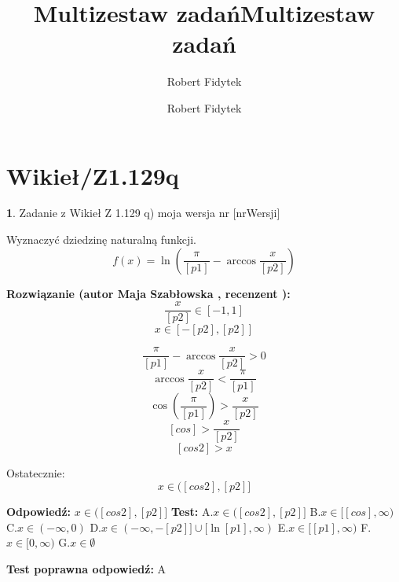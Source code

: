 \documentclass[12pt, a4paper]{article}
\title{Multizestaw zadań}
\author{Robert Fidytek}
\date{}\documentclass[12pt, a4paper]{article}
\title{Multizestaw zadań}
\author{Robert Fidytek}
\date{}
\theoremstyle{definition} %
\newtheorem{zad}{}
\theoremstyle{definition} %
\newtheorem{zad}{}
\newcommand{\kategoria}[1]{\section{#1}} %
\newcommand{\zadStart}[1]{\begin{zad}#1\newline} %
\newcommand{\zadStop}{\end{zad}}   %
\newcommand{\rozwStart}[2]{\noindent \textbf{Rozwiązanie (autor #1 , recenzent #2): }\newline} %
\newcommand{\rozwStop}{\newline}                                            %
\newcommand{\odpStart}{\noindent \textbf{Odpowiedź:}\newline}    %
\newcommand{\odpStop}{\newline}                                             %
\newcommand{\testStart}{\noindent \textbf{Test:}\newline} %
\newcommand{\testStop}{\newline} %
\newcommand{\kluczStart}{\noindent \textbf{Test poprawna odpowiedź:}\newline} %
\newcommand{\kluczStop}{\newline} %
\begin{document}
\maketitle


\kategoria{Wikieł/Z1.129q}
\zadStart{Zadanie z Wikieł Z 1.129 q) moja wersja nr [nrWersji]}



Wyznaczyć dziedzinę naturalną funkcji.
$$f(x)=\ln\left(\frac{\pi}{[p1]}-\arccos\frac{x}{[p2]}\right)$$
\zadStop

\rozwStart{Maja Szabłowska}{}
$$\frac{x}{[p2]} \in [-1,1]$$
$$x\in[-[p2],[p2]]$$

$$\frac{\pi}{[p1]}-\arccos\frac{x}{[p2]}>0$$
$$\arccos\frac{x}{[p2]}<\frac{\pi}{[p1]}$$
$$\cos\left(\frac{\pi}{[p1]}\right)>\frac{x}{[p2]}$$
$$[cos]>\frac{x}{[p2]}$$
$$[cos2]>x$$

Ostatecznie:
$$x\in([cos2], [p2]]$$


\rozwStop
\odpStart
$x\in([cos2], [p2]]$
\odpStop
\testStart
A.$x\in([cos2], [p2]]$
B.$x\in[[cos],\infty)$
C.$x\in(-\infty, 0)$
D.$x\in(-\infty, -[p2]] \cup [\ln[p1],\infty)$
E.$x\in[[p1],\infty)$
F.$x\in[0,\infty)$
G.$x\in\emptyset$

\testStop
\kluczStart
A
\kluczStop
\end{document}
